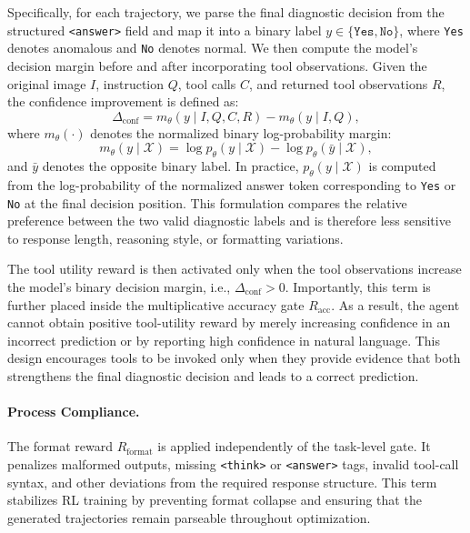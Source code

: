 \documentclass{llmxive}
\begin{document}
{Specifically, for each trajectory, we parse the final diagnostic decision from the structured \texttt{<answer>} field and map it into a binary label $y \in \{\texttt{Yes}, \texttt{No}\}$, where \texttt{Yes} denotes anomalous and \texttt{No} denotes normal. 
We then compute the model's decision margin before and after incorporating tool observations. 
Given the original image $I$, instruction $Q$, tool calls $C$, and returned tool observations $R$, the confidence improvement is defined as:
\begin{equation}
\Delta_{\text{conf}}
=
m_{\theta}(y \mid I, Q, C, R)
-
m_{\theta}(y \mid I, Q),
\end{equation}
where $m_{\theta}(\cdot)$ denotes the normalized binary log-probability margin:
\begin{equation}
m_{\theta}(y \mid \mathcal{X})
=
\log p_{\theta}(y \mid \mathcal{X})
-
\log p_{\theta}(\bar{y} \mid \mathcal{X}),
\end{equation}
and $\bar{y}$ denotes the opposite binary label. 
In practice, $p_{\theta}(y \mid \mathcal{X})$ is computed from the log-probability of the normalized answer token corresponding to \texttt{Yes} or \texttt{No} at the final decision position. 
This formulation compares the relative preference between the two valid diagnostic labels and is therefore less sensitive to response length, reasoning style, or formatting variations.

The tool utility reward is then activated only when the tool observations increase the model's binary decision margin, i.e., $\Delta_{\text{conf}}>0$. 
Importantly, this term is further placed inside the multiplicative accuracy gate $R_{\text{acc}}$. 
As a result, the agent cannot obtain positive tool-utility reward by merely increasing confidence in an incorrect prediction or by reporting high confidence in natural language. 
This design encourages tools to be invoked only when they provide evidence that both strengthens the final diagnostic decision and leads to a correct prediction.


\paragraph{Process Compliance.}
The format reward $R_{\text{format}}$ is applied independently of the task-level gate. 
It penalizes malformed outputs, missing \texttt{<think>} or \texttt{<answer>} tags, invalid tool-call syntax, and other deviations from the required response structure. 
This term stabilizes RL training by preventing format collapse and ensuring that the generated trajectories remain parseable throughout optimization.

}
\end{document}
